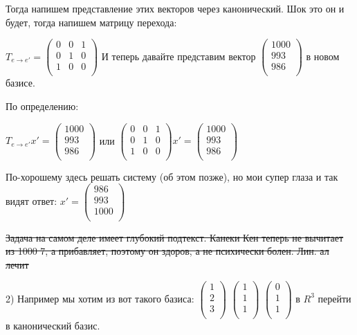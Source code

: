 \documentclass{article}
\begin{document}
Тогда напишем представление этих векторов через канонический. Шок это он и будет, тогда напишем матрицу перехода:

$T_{e \rightarrow e'} = \begin{pmatrix}
    0 & 0 & 1\\
    0 & 1 & 0\\
    1 & 0 & 0\\
\end{pmatrix}$
И теперь давайте представим вектор $ \begin{pmatrix}
    1000 \\
    993 \\
    986 \\
\end{pmatrix}$ в новом базисе.

По определению:

$T_{e \rightarrow e'} x' = \begin{pmatrix}
    1000 \\
    993  \\
    986  \\
\end{pmatrix} $ или  $ \begin{pmatrix}
    0 & 0 & 1\\
    0 & 1 & 0\\
    1 & 0 & 0\\
\end{pmatrix}x' = \begin{pmatrix}
    1000  \\
    993  \\
    986  \\
\end{pmatrix} $

По-хорошему здесь решать систему (об этом позже), но мои супер глаза и так видят ответ: $x' =  \begin{pmatrix}
    986 \\
    993  \\
    1000  \\
\end{pmatrix} $

\sout{Задача на самом деле имеет глубокий подтекст. Канеки Кен теперь не вычитает из 1000 7, а прибавляет, поэтому он здоров, а не психически болен. Лин. ал лечит}

2) Например мы хотим из вот такого базиса: $\begin{pmatrix}
    1\\
    2\\
    3\\
\end{pmatrix}$ $\begin{pmatrix}
    1\\
    1\\
    1\\
\end{pmatrix}$ $\begin{pmatrix}
    0\\
    1\\
    1\\
\end{pmatrix}$ в $R^3$ перейти  в канонический базис. 
\end{document}
